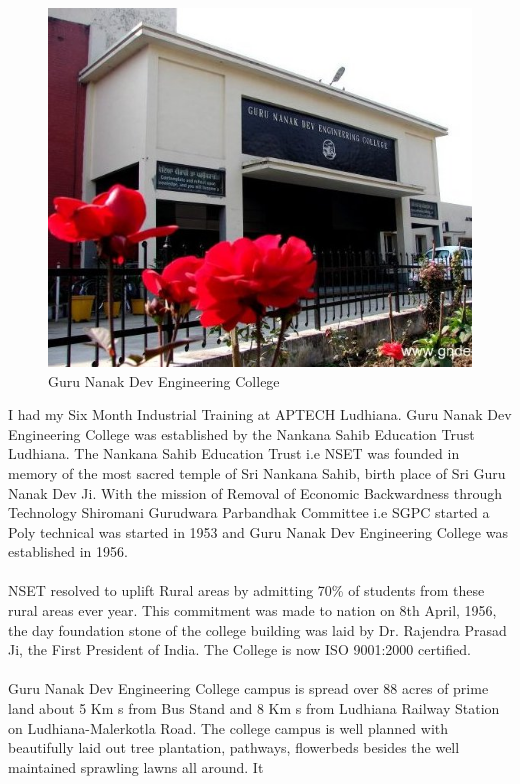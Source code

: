 \begin{figure}[ht]
\centering
\includegraphics[scale=0.7]{images/gndec.jpg}
\caption{Guru Nanak Dev Engineering College}
\end{figure}
\hspace{-1.7em} I had my Six Month Industrial Training at APTECH Ludhiana. Guru Nanak Dev Engineering College was established by the Nankana
Sahib Education Trust Ludhiana. The Nankana Sahib Education Trust i.e NSET
was founded in memory of the most sacred temple of Sri Nankana Sahib, birth place
of Sri Guru Nanak Dev Ji. With the mission of Removal of Economic Backwardness
through Technology Shiromani Gurudwara Parbandhak Committee i.e SGPC started a
Poly technical was started in 1953 and Guru Nanak Dev Engineering College was established in 1956.\\\\
NSET resolved to uplift Rural areas by admitting 70\% 
of students from these rural
areas ever year. This commitment was made to nation on 8th April, 1956, the day
foundation stone of the college building was laid by Dr. Rajendra Prasad Ji, the First
President of India. The College is now ISO 9001:2000 certified.\\\\
Guru Nanak Dev Engineering College campus is spread over 88 acres of prime land
about 5 Km s from Bus Stand and 8 Km s from Ludhiana Railway Station on Ludhiana-Malerkotla Road. The college campus is well planned with beautifully laid out tree plantation, pathways, flowerbeds besides the well maintained sprawling lawns all around. It
